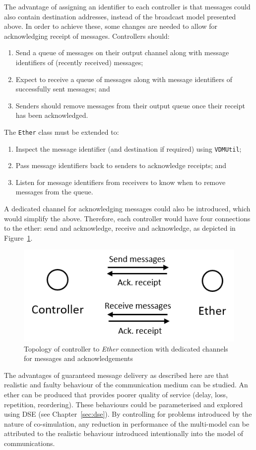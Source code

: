 The advantage of assigning an identifier to each controller is that messages could also contain destination addresses, instead of the broadcast model presented above. In order to achieve these, some changes are needed to allow for acknowledging receipt of messages. Controllers should:

\begin{enumerate}[noitemsep]
\item Send a queue of messages on their output channel along with message identifiers of (recently received) messages;
\item Expect to receive a queue of messages along with message identifiers of successfully sent messages; and
\item Senders should remove messages from their output queue once their receipt has been acknowledged.
\end{enumerate}

The \texttt{Ether} class must be extended to:

\begin{enumerate}[noitemsep]
\item Inspect the message identifier (and destination if required) using \texttt{VDMUtil};
\item Pass message identifiers back to senders to acknowledge receipts; and
\item Listen for message identifiers from receivers to know when to remove messages from the queue.
\end{enumerate}

A dedicated channel for acknowledging messages could also be introduced, which would simplify the above. Therefore, each controller would have four connections to the ether: send and acknowledge, receive and acknowledge, as depicted in Figure~\ref{fig:ack}.

\begin{figure}
\centering
\includegraphics[scale=0.6]{figures/ack_channel}
\caption{Topology of controller to \emph{Ether} connection with dedicated channels for messages and acknowledgements}
\label{fig:ack}
\end{figure}

The advantages of guaranteed message delivery as described here are that realistic and faulty behaviour of the communication medium can be studied. An ether can be produced that provides poorer quality of service (delay, loss, repetition, reordering). These behaviours could be parameterised and explored using DSE (see Chapter~\ref{sec:dse}). By controlling for problems introduced by the nature of co-simulation, any reduction in performance of the multi-model can be attributed to the realistic behaviour introduced intentionally into the model of communications.

